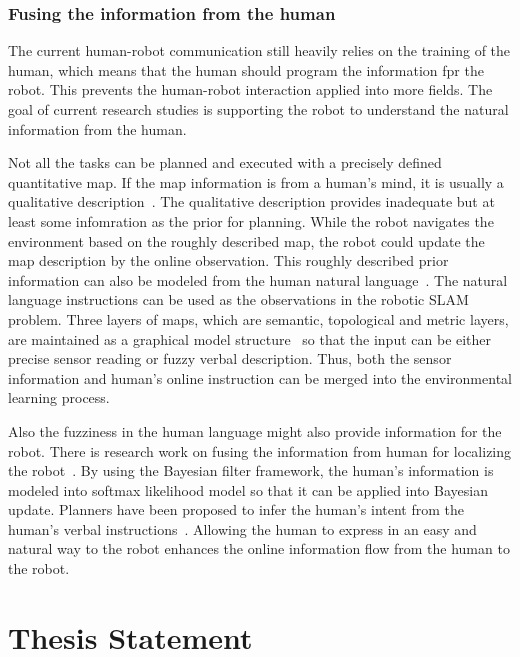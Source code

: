 \documentclass[phd]{byuprop}
\begin{document}
\subsubsection{Fusing the information from the human}

The current human-robot communication still heavily relies on the training of the human, which means that the human should program the information fpr the robot.
This prevents the human-robot interaction applied into more fields.
The goal of current research studies is supporting the robot to understand the natural information from the human.
 
Not all the tasks can be planned and executed with a precisely defined quantitative map.
If the map information is from a human's mind, it is usually a qualitative description~\cite{mcclelland2012qualitative,6425551,mcclelland2014qualitative,shah2013qualitative}.
The qualitative description provides inadequate but at least some infomration as the prior for planning.
While the robot navigates the environment based on the roughly described map, the robot could update the map description by the online observation.
This roughly described prior information can also be modeled from the human natural language~\cite{tellex2011understanding,walter2014framework}.
The natural language instructions can be used as the observations in the robotic SLAM problem.
Three layers of maps, which are semantic, topological and metric layers, are maintained as a graphical model structure~\cite{walter2014framework} so that the input can be either precise sensor reading or fuzzy verbal description.
Thus, both the sensor information and human's online instruction can be merged into the environmental learning process.

Also the fuzziness in the human language might also provide information for the robot.
There is research work on fusing the information from human for localizing the robot~\cite{6301744,5509521,ahmed2014enabling}.
By using the Bayesian filter framework, the human's information is modeled into softmax likelihood model so that it can be applied into Bayesian update.
Planners have been proposed to infer the human's intent from the human's verbal instructions~\cite{howard2014natural,Duvallet_2014_7795}.
Allowing the human to express in an easy and natural way to the robot enhances the online information flow from the human to the robot.

\section{Thesis Statement}
\end{document}
